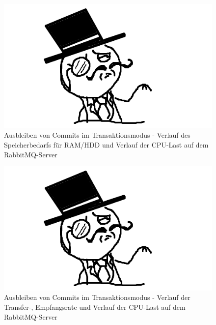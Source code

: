 \documentclass[	a4paper,
			11pt,
			titlepage,
			oneside,
			fleqn,
			listof=totoc,
			parskip,
			numbers=noenddot]{scrartcl}
\begin{document}
		\begin{figure}[!htb]
			\centering
			\includegraphics[width=\textwidth]{img/stub.png}
			\caption{Ausbleiben von Commits im Transaktionsmodus - Verlauf des Speicherbedarfs für RAM/HDD und Verlauf der CPU-Last auf dem RabbitMQ-Server}
			\label{fig:commit-server1}
		\end{figure}
		
		\begin{figure}[!htb]
			\centering
			\includegraphics[width=\textwidth]{img/stub.png}
			\caption{Ausbleiben von Commits im Transaktionsmodus - Verlauf der Transfer-, Empfangsrate und Verlauf der CPU-Last auf dem RabbitMQ-Server}
			\label{fig:commit-server2}
		\end{figure}
		
\end{document}
